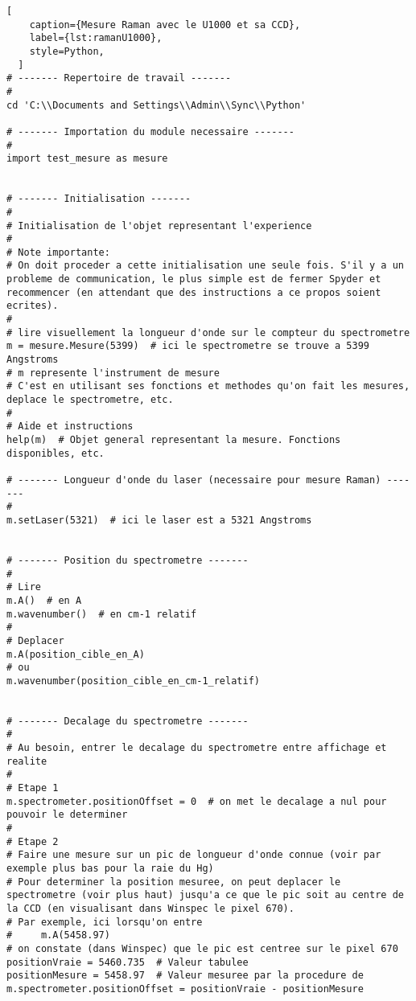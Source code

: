 \documentclass[11pt,francais]{book} %
\begin{document}
\begin{lstlisting}[
    caption={Mesure Raman avec le U1000 et sa CCD},
    label={lst:ramanU1000},
    style=Python,
  ]  
# ------- Repertoire de travail ------- 
#
cd 'C:\\Documents and Settings\\Admin\\Sync\\Python'

# ------- Importation du module necessaire ------- 
#
import test_mesure as mesure


# ------- Initialisation ------- 
#
# Initialisation de l'objet representant l'experience
#
# Note importante:
# On doit proceder a cette initialisation une seule fois. S'il y a un probleme de communication, le plus simple est de fermer Spyder et recommencer (en attendant que des instructions a ce propos soient ecrites).
#	
# lire visuellement la longueur d'onde sur le compteur du spectrometre
m = mesure.Mesure(5399)  # ici le spectrometre se trouve a 5399 Angstroms
# m represente l'instrument de mesure
# C'est en utilisant ses fonctions et methodes qu'on fait les mesures, deplace le spectrometre, etc.
#
# Aide et instructions
help(m)  # Objet general representant la mesure. Fonctions disponibles, etc.

# ------- Longueur d'onde du laser (necessaire pour mesure Raman) ------- 
#
m.setLaser(5321)  # ici le laser est a 5321 Angstroms


# ------- Position du spectrometre ------- 
#
# Lire
m.A()  # en A
m.wavenumber()  # en cm-1 relatif
#
# Deplacer
m.A(position_cible_en_A)
# ou
m.wavenumber(position_cible_en_cm-1_relatif)


# ------- Decalage du spectrometre ------- 
#
# Au besoin, entrer le decalage du spectrometre entre affichage et realite
#
# Etape 1
m.spectrometer.positionOffset = 0  # on met le decalage a nul pour pouvoir le determiner
#
# Etape 2
# Faire une mesure sur un pic de longueur d'onde connue (voir par exemple plus bas pour la raie du Hg)
# Pour determiner la position mesuree, on peut deplacer le spectrometre (voir plus haut) jusqu'a ce que le pic soit au centre de la CCD (en visualisant dans Winspec le pixel 670).
# Par exemple, ici lorsqu'on entre
#     m.A(5458.97)
# on constate (dans Winspec) que le pic est centree sur le pixel 670
positionVraie = 5460.735  # Valeur tabulee
positionMesure = 5458.97  # Valeur mesuree par la procedure de
m.spectrometer.positionOffset = positionVraie - positionMesure



\end{lstlisting}
\end{document}
